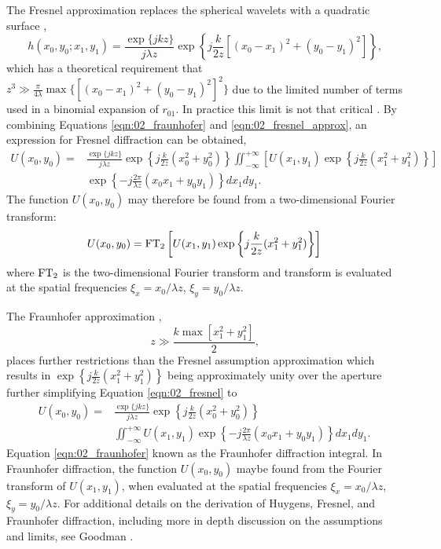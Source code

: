 The Fresnel approximation replaces the spherical wavelets with a quadratic surface \cite{Fresnel-1818-FmMCMbDK},
\begin{equation}
  h(x_0,y_0;x_1,y_1) = \frac{\exp\{jkz\}}{j\lambda z}\exp\left\{j\frac{k}{2z}[(x_0-x_1)^2+(y_0-y_1)^2]\right\} \textrm{,}
  \label{eqn:02_fresnel_approx}
\end{equation}
which has a theoretical requirement that $z^3 \gg \frac{\pi}{4\lambda}\max\{[(x_0-x_1)^2+(y_0-y_1)^2]^2\}$ due to the limited number of terms used in a binomial expansion of $r_{01}$.
In practice this limit is not that critical \cite{Goodman-1968-zPUmuuzx}.
By combining Equations \ref{eqn:02_fraunhofer} and \ref{eqn:02_fresnel_approx}, an expression for Fresnel diffraction can be obtained,
\begin{equation}
  \begin{aligned}
    U(x_0,y_0) =& \frac{\exp\{jkz\}}{j\lambda z}\exp\left\{j\frac{k}{2z}(x_0^2+y_0^2)\right\}\iint_{-\infty}^{+\infty}\left[U(x_1,y_1)\exp\left\{j\frac{k}{2z}(x_1^2+y_1^2)\right\}\right] \\
    &\exp\left\{-j\frac{2\pi}{\lambda z}(x_0x_1+y_0y_1)\right\} dx_1dy_1 \textrm{.}
  \end{aligned}
  \label{eqn:02_fresnel}
\end{equation}
The function $U(x_0,y_0)$ may therefore be found from a two-dimensional Fourier transform:
\begin{equation}
  U(x_0,y_0) = \operatorname{FT}_2\left[U(x_1,y_1)\exp\left\{j\frac{k}{2z}(x_1^2+y_1^2)\right\}\right]
  \label{eqn:02_fresnel_fft}
\end{equation}
where $\operatorname{FT}_2$ is the two-dimensional Fourier transform and transform is evaluated at the spatial frequencies $\xi_x = x_0/\lambda z$, $\xi_y = y_0/\lambda z$.

The Fraunhofer approximation \cite{Goodman-1968-zPUmuuzx},
\begin{equation}
  z \gg \frac{k\max[x_1^2+y_1^2]}{2} \textrm{,}
  \label{eqn:02_fraunhofer_approx}
\end{equation}
places further restrictions than the Fresnel assumption approximation which results in
$\exp\left\{j\frac{k}{2z}(x_1^2+y_1^2)\right\}$ being approximately unity over the aperture further simplifying Equation \ref{eqn:02_fresnel} to
\begin{equation}
  \begin{aligned}
    U(x_0,y_0) =& \frac{\exp\{jkz\}}{j\lambda z}\exp\left\{j\frac{k}{2z}(x_0^2+y_0^2)\right\} \\
    &\iint_{-\infty}^{+\infty}U(x_1,y_1)\exp\left\{-j\frac{2\pi}{\lambda z}(x_0x_1+y_0y_1)\right\} dx_1dy_1 \textrm{.}
  \end{aligned}
  \label{eqn:02_fraunhofer}
\end{equation}
Equation \ref{eqn:02_fraunhofer} known as the Fraunhofer diffraction integral.
In Fraunhofer diffraction, the function $U(x_0,y_0)$ maybe found from the Fourier transform of $U(x_1,y_1)$, when evaluated at the spatial frequencies $\xi_x = x_0/\lambda z$, $\xi_y = y_0/\lambda z$.
For additional details on the derivation of Huygens, Fresnel, and Fraunhofer diffraction, including more in depth discussion on the assumptions and limits, see Goodman \cite{Goodman-1968-zPUmuuzx}.

